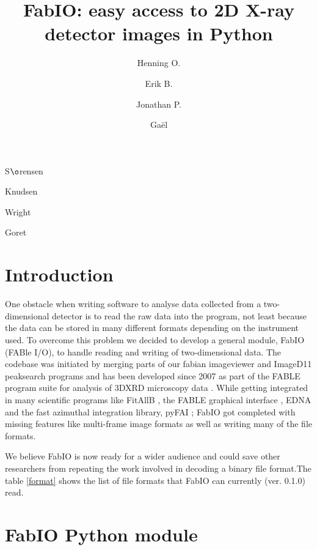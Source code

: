 \documentclass{iucr}
\begin{document}
\title{FabIO: easy access to 2D X-ray detector images in Python}

    \author[a]{Henning O.}{S$\o$rensen}
    \author[b]{Erik B.}{Knudsen}
    \author[c]{Jonathan P.}{Wright}
	\author[c]{Ga\"el}{Goret}

\maketitle

\section{Introduction}

One obstacle when writing software to analyse data collected from a
two-dimensional detector is to read the raw data into the program,
not least because the data can be stored in many different formats
depending on the instrument used.
To overcome this problem we decided to develop a general module,
FabIO (FABle I/O), to handle reading and writing of two-dimensional
data.
The codebase was initiated by merging parts of our fabian imageviewer
\cite{fabian} and ImageD11 \cite{ImageD11} peaksearch programs and has
been developed since 2007 as part of the FABLE \cite{fable} program suite
for analysis of 3DXRD microscopy data \cite{3dxrd}.
While getting integrated in many scientific programs like FitAllB
\cite{fitallb}, the FABLE graphical interface \cite{fable}, EDNA \cite{edna} and
the fast azimuthal integration library, pyFAI \cite{pyfai}; FabIO got
completed with missing features like multi-frame image formats as well as
writing many of the file formats.

We believe FabIO is now ready for a wider audience and could save other
researchers from repeating the work involved in decoding a
binary file format.The table \ref{format} shows the list of file formats that
FabIO can currently (ver. 0.1.0) read.


\section{FabIO Python module}
\end{document}
